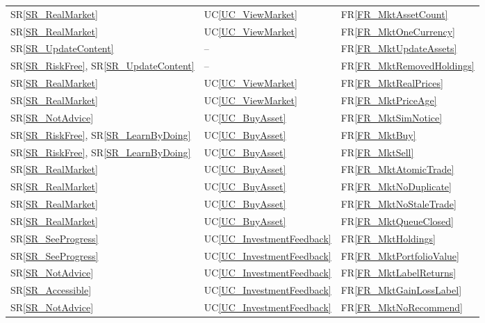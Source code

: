 \documentclass[12pt]{article}
\newcommand{\srref}[1]{SR\ref{#1}}
\newcommand{\ucref}[1]{UC\ref{#1}}
\newcommand{\rref}[1]{FR\ref{#1}}
\begin{document}
\begin{longtable}{p{} p{} p{}}
\srref{SR_RealMarket} & \ucref{UC_ViewMarket} & \rref{FR_MktAssetCount} \\
\srref{SR_RealMarket} & \ucref{UC_ViewMarket} & \rref{FR_MktOneCurrency} \\
\srref{SR_UpdateContent} & -- & \rref{FR_MktUpdateAssets} \\
\srref{SR_RiskFree}, \srref{SR_UpdateContent} & -- & \rref{FR_MktRemovedHoldings} \\
\srref{SR_RealMarket} & \ucref{UC_ViewMarket} & \rref{FR_MktRealPrices} \\
\srref{SR_RealMarket} & \ucref{UC_ViewMarket} & \rref{FR_MktPriceAge} \\
\srref{SR_NotAdvice} & \ucref{UC_BuyAsset} & \rref{FR_MktSimNotice} \\
\srref{SR_RiskFree}, \srref{SR_LearnByDoing} & \ucref{UC_BuyAsset} & \rref{FR_MktBuy} \\
\srref{SR_RiskFree}, \srref{SR_LearnByDoing} & \ucref{UC_BuyAsset} & \rref{FR_MktSell} \\
\srref{SR_RealMarket} & \ucref{UC_BuyAsset} & \rref{FR_MktAtomicTrade} \\
\srref{SR_RealMarket} & \ucref{UC_BuyAsset} & \rref{FR_MktNoDuplicate} \\
\srref{SR_RealMarket} & \ucref{UC_BuyAsset} & \rref{FR_MktNoStaleTrade} \\
\srref{SR_RealMarket} & \ucref{UC_BuyAsset} & \rref{FR_MktQueueClosed} \\
\srref{SR_SeeProgress} & \ucref{UC_InvestmentFeedback} & \rref{FR_MktHoldings} \\
\srref{SR_SeeProgress} & \ucref{UC_InvestmentFeedback} & \rref{FR_MktPortfolioValue} \\
\srref{SR_NotAdvice} & \ucref{UC_InvestmentFeedback} & \rref{FR_MktLabelReturns} \\
\srref{SR_Accessible} & \ucref{UC_InvestmentFeedback} & \rref{FR_MktGainLossLabel} \\
\srref{SR_NotAdvice} & \ucref{UC_InvestmentFeedback} & \rref{FR_MktNoRecommend} \\


\end{longtable}
\end{document}
